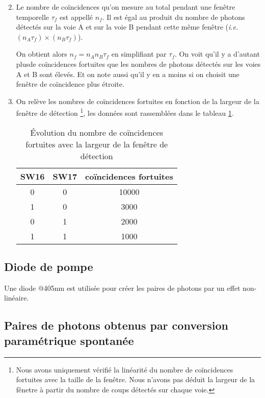 \documentclass[twocolumn, 10pt]{article}
\begin{document}
\begin{enumerate}
\setcounter{enumi}{1}
    \item \par Le nombre de coïncidences qu'on mesure au total pendant une fenêtre temporelle $\tau_f$ est appellé $n_f$. Il est égal au produit du nombre de photons détectés sur la voie A et sur la voie B pendant cette même fenêtre (\textit{i.e.} $(n_A \tau_f) \times (n_B \tau_f)$).
    \par On obtient alors $n_f = n_A n_B \tau_f$ en simplifiant par $\tau_f$. On voit qu'il y a d'autant plusde coïncidences fortuites que les nombres de photons détectés sur les voies A et B sont élevés. Et on note aussi qu'il y en a moins si on choisit une fenêtre de coïncidence plus étroite.

\item \par On relève les nombres de coïncidences fortuites en fonction de la largeur de la fenêtre de détection \footnote{Nous avons uniquement vérifié la linéarité du nombre de coïncidences fortuites avec la taille de la fenêtre. Nous n'avons pas déduit la largeur de la fênetre à partir du nombre de coups détectés sur chaque voie.}, les données sont rassemblées dans le tableau \ref{fortuites}.
\begin{table}[H]
\centering
    \begin{tabular}{||c|c|c||}
    \hline
    SW16 & SW17 & coïncidences fortuites \\ \hline \hline
    0 & 0 & 10000 \\ \hline %
    1 & 0 & 3000 \\ \hline
    0 & 1 & 2000 \\ \hline
    1 & 1 & 1000 \\ \hline
    \end{tabular}
    \caption{\label{fortuites}\'Evolution du nombre de coïncidences fortuites avec la largeur de la fenêtre de détection} 
\end{table}

\end{enumerate}

\subsection{Diode de pompe}
\par Une diode @405nm est utilisée pour créer les paires de photons par un effet non-linéaire.

\subsection{Paires de photons obtenus par conversion paramétrique spontanée}
\end{document}
